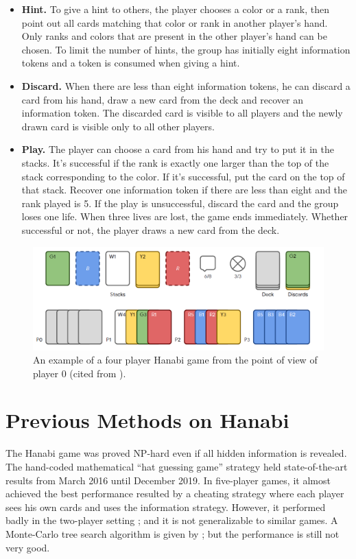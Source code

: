 \documentclass[12pt]{article}
\begin{document}
\begin{spacing}{1.15}
\begin{itemize}
\item \textbf{Hint.} To give a hint to others, the player chooses a color or a rank, then point out all cards matching that color or rank in another player's hand. Only ranks and colors that are present in the other player's hand can be chosen. To limit the number of hints, the group has initially eight information tokens and a token is consumed when giving a hint.
\item \textbf{Discard.} When there are less than eight information tokens, he can discard a card from his hand, draw a new card from the deck and recover an information token. The discarded card is visible to all players and the newly drawn card is visible only to all other players.
\item \textbf{Play.} The player can choose a card from his hand and try to put it in the stacks. It's successful if the rank is exactly one larger than the top of the stack corresponding to the color. If it's successful, put the card on the top of that stack. Recover one information token if there are less than eight and the rank played is 5. If the play is unsuccessful, discard the card and the group loses one life. When three lives are lost, the game ends immediately. Whether successful or not, the player draws a new card from the deck.
\end{itemize}

\begin{figure}[H]
\centerline{\includegraphics[width=6in]{fig1.png}}
\caption{An example of a four player Hanabi game from the point of view of player 0 (cited from \cite{bard2020the}).}
\label{Fig1}
\end{figure}

\section{Previous Methods on Hanabi}

The Hanabi game was proved \textsf{NP}-hard even if all hidden information is revealed. \citep{baffier2017hanabi} The hand-coded mathematical ``hat guessing game'' strategy \citep{cox2015how} held state-of-the-art results from March 2016 until December 2019. In five-player games, it almost achieved the best performance resulted by a cheating strategy where each player sees his own cards and uses the information strategy. However, it performed badly in the two-player setting \citep{bouzy2017playing}; and it is not generalizable to similar games. A Monte-Carlo tree search algorithm is given by \cite{walton-rivers2017evaluating}; but the performance is still not very good.


\end{spacing}
\end{document}

